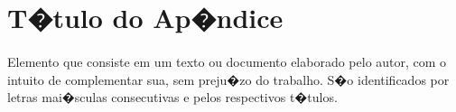 \section{T�tulo do Ap�ndice} \label{ap:defesa}

\paragraph{}Elemento que consiste em um texto ou documento elaborado pelo autor, com o intuito de complementar sua, sem preju�zo do trabalho. S�o identificados por letras mai�sculas consecutivas e pelos respectivos t�tulos.